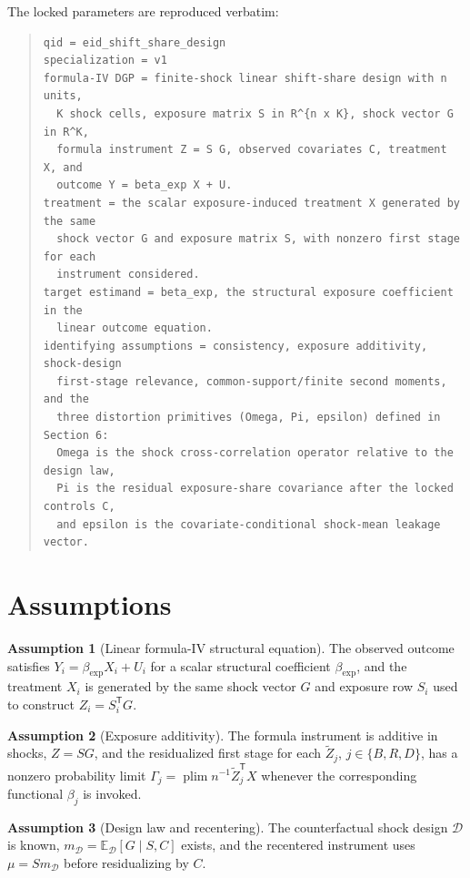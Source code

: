 \documentclass[11pt]{article}
\newcommand{\E}{\mathbb{E}}
\newcommand{\transpose}{\mathsf{T}}
\newcommand{\plim}{\operatorname*{plim}}
\theoremstyle{definition}
\newtheorem{assumption}{Assumption}
\theoremstyle{plain}
\theoremstyle{remark}
\begin{document}
The locked parameters are reproduced verbatim:
\begin{quote}
\begin{verbatim}
qid = eid_shift_share_design
specialization = v1
formula-IV DGP = finite-shock linear shift-share design with n units,
  K shock cells, exposure matrix S in R^{n x K}, shock vector G in R^K,
  formula instrument Z = S G, observed covariates C, treatment X, and
  outcome Y = beta_exp X + U.
treatment = the scalar exposure-induced treatment X generated by the same
  shock vector G and exposure matrix S, with nonzero first stage for each
  instrument considered.
target estimand = beta_exp, the structural exposure coefficient in the
  linear outcome equation.
identifying assumptions = consistency, exposure additivity, shock-design
  first-stage relevance, common-support/finite second moments, and the
  three distortion primitives (Omega, Pi, epsilon) defined in Section 6:
  Omega is the shock cross-correlation operator relative to the design law,
  Pi is the residual exposure-share covariance after the locked controls C,
  and epsilon is the covariate-conditional shock-mean leakage vector.
\end{verbatim}
\end{quote}

\section{Assumptions}
\begin{assumption}[Linear formula-IV structural equation]\label{ass:linear}
The observed outcome satisfies $Y_i=\beta_{\exp}X_i+U_i$ for a scalar structural coefficient $\beta_{\exp}$, and the treatment $X_i$ is generated by the same shock vector $G$ and exposure row $S_i$ used to construct $Z_i=S_i^\transpose G$.
\end{assumption}

\begin{assumption}[Exposure additivity]\label{ass:additive}
The formula instrument is additive in shocks, $Z=SG$, and the residualized first stage for each $\widetilde Z_j$, $j\in\{B,R,D\}$, has a nonzero probability limit $\Gamma_j=\plim n^{-1}\widetilde Z_j^\transpose X$ whenever the corresponding functional $\beta_j$ is invoked.
\end{assumption}

\begin{assumption}[Design law and recentering]\label{ass:design}
The counterfactual shock design $\mathcal{D}$ is known, $m_{\mathcal{D}}=\E_{\mathcal{D}}[G\mid S,C]$ exists, and the recentered instrument uses $\mu=S m_{\mathcal{D}}$ before residualizing by $C$.
\end{assumption}
\end{document}
